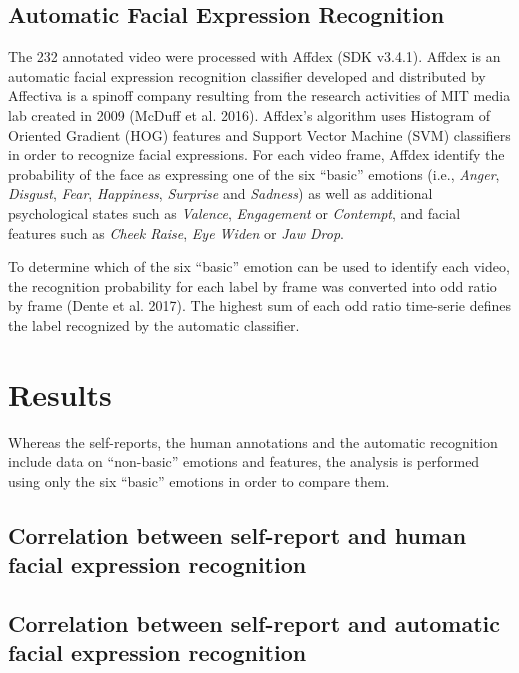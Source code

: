 \documentclass[conference,final,]{IEEEtran}
\begin{document}
\hypertarget{automatic-facial-expression-recognition}{%
\subsection{Automatic Facial Expression
Recognition}\label{automatic-facial-expression-recognition}}

The 232 annotated video were processed with Affdex (SDK v3.4.1). Affdex
is an automatic facial expression recognition classifier developed and
distributed by Affectiva is a spinoff company resulting from the
research activities of MIT media lab created in 2009 (McDuff et al.
2016). Affdex's algorithm uses Histogram of Oriented Gradient (HOG)
features and Support Vector Machine (SVM) classifiers in order to
recognize facial expressions. For each video frame, Affdex identify the
probability of the face as expressing one of the six ``basic'' emotions
(i.e., \emph{Anger}, \emph{Disgust}, \emph{Fear}, \emph{Happiness},
\emph{Surprise} and \emph{Sadness}) as well as additional psychological
states such as \emph{Valence}, \emph{Engagement} or \emph{Contempt}, and
facial features such as \emph{Cheek Raise}, \emph{Eye Widen} or
\emph{Jaw Drop}.

To determine which of the six ``basic'' emotion can be used to identify
each video, the recognition probability for each label by frame was
converted into odd ratio by frame (Dente et al. 2017). The highest sum
of each odd ratio time-serie defines the label recognized by the
automatic classifier.

\hypertarget{results}{%
\section{Results}\label{results}}

Whereas the self-reports, the human annotations and the automatic
recognition include data on ``non-basic'' emotions and features, the
analysis is performed using only the six ``basic'' emotions in order to
compare them.

\hypertarget{correlation-between-self-report-and-human-facial-expression-recognition}{%
\subsection{Correlation between self-report and human facial expression
recognition}\label{correlation-between-self-report-and-human-facial-expression-recognition}}

\hypertarget{correlation-between-self-report-and-automatic-facial-expression-recognition}{%
\subsection{Correlation between self-report and automatic facial
expression
recognition}\label{correlation-between-self-report-and-automatic-facial-expression-recognition}}
\end{document}
